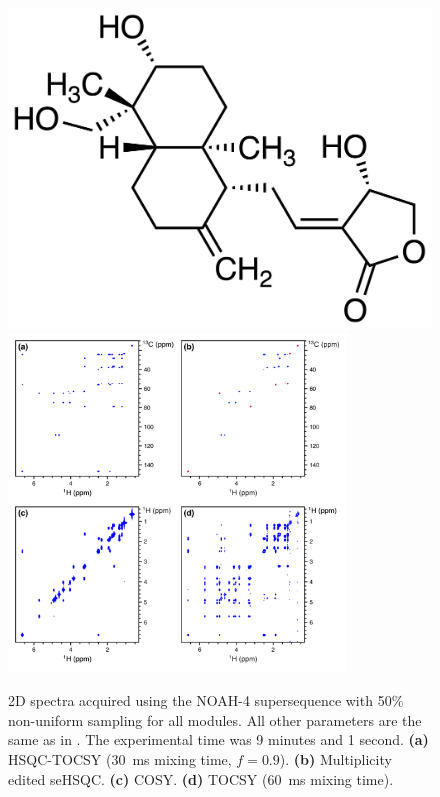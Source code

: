 \begin{figure}
    \centering
    \includegraphics{./figures/andro.png}\phantom{aaaaaa}
    \includegraphics[width=0.8\textwidth]{./figures/stspct_nus.png}
    \caption{
        2D spectra acquired using the NOAH-4  supersequence with 50\% non-uniform sampling for all modules.
        All other parameters are the same as in .
        The experimental time was 9 minutes and 1 second.
        \textbf{(a)} HSQC-TOCSY (\SI{30}{ms} mixing time, $f = 0.9$).
        \textbf{(b)} Multiplicity edited seHSQC.
        \textbf{(c)} COSY.
        \textbf{(d)} TOCSY (\SI{60}{ms} mixing time).
        \andro{}
    }
    \label{fig:stspct_nus}
\end{figure}


